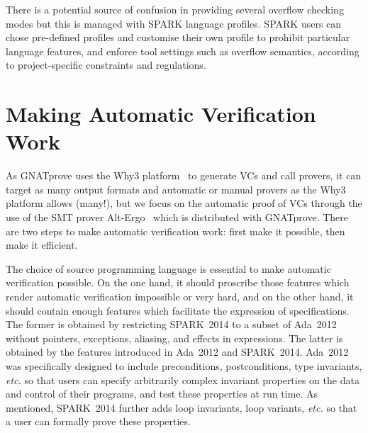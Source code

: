 \documentclass[sttt,final]{svjour}
\newcommand{\gnatprove}{GNATprove\xspace}
\newcommand{\newspark}{SPARK~2014\xspace}
\newcommand{\adatwtw}{Ada~2012\xspace}
\newcommand{\etc}{\textit{etc.}\xspace}
\begin{document}
There is a potential source of confusion in providing several overflow
checking modes but this is managed with SPARK language profiles. SPARK
users can chose pre-defined profiles and customise their own profile
to prohibit particular language features, and enforce tool settings
such as overflow semantics, according to project-specific constraints
and regulations.

\section{Making Automatic Verification Work}
\label{automation}

As \gnatprove uses the Why3 platform~\cite{why3} to generate VCs and
call provers, it can target as many output formats and automatic or
manual provers as the Why3 platform allows (many!), but we focus on
the automatic proof of VCs through the use of the SMT prover
Alt-Ergo~\cite{altergo} which is distributed with \gnatprove. There
are two steps to make automatic verification work: first make it
possible, then make it efficient.

The choice of source programming language is essential to make
automatic verification possible. On the one hand, it should proscribe
those features which render automatic verification impossible or very
hard, and on the other hand, it should contain enough features which
facilitate the expression of specifications. The former is obtained by
restricting \newspark to a subset of \adatwtw without pointers,
exceptions, aliasing, and effects in expressions. The latter is
obtained by the features introduced in \adatwtw and
\newspark. \adatwtw was specifically designed to include
preconditions, postconditions, type invariants, \etc so that users can
specify arbitrarily complex invariant properties on the data and
control of their programs, and test these properties at run time. As
mentioned, \newspark further adds loop invariants, loop variants, \etc
so that a user can formally prove these properties.
\end{document}
